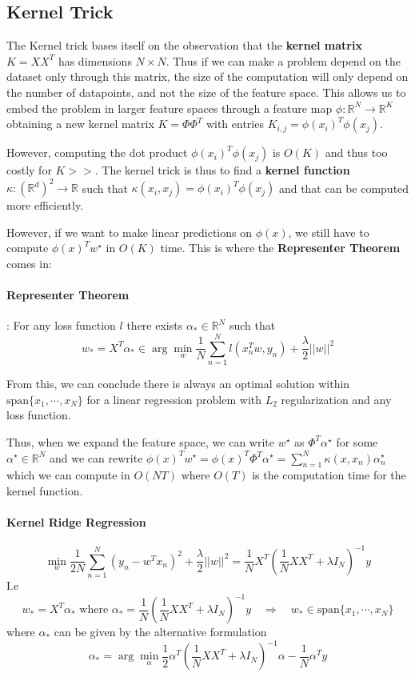 \documentclass{article}
\newcommand{\R}{\mathbb{R}}
\begin{document}
\subsection{Kernel Trick}

The Kernel trick bases itself on the observation that the \textbf{kernel matrix} $K = X X^T$ has dimensions $N \times N$.
Thus if we can make a problem depend on the dataset only through this matrix, the size of the computation will only depend on the number of datapoints, and not the size of the feature space.
This allows us to embed the problem in larger feature spaces through a feature map $\phi : \R^N \to \R^K$ obtaining a new kernel matrix $K = \Phi \Phi^T$ with entries $K_{i,j} = \phi(x_i)^T \phi(x_j)$.

However, computing the dot product $\phi(x_i)^T \phi(x_j)$ is $O(K)$ and thus too costly for $K >>$.
The kernel trick is thus to find a \textbf{kernel function} $\kappa : (\R^d)^2 \to \R$ such that $\kappa(x_i, x_j) = \phi(x_i)^T \phi(x_j)$ and that can be computed more efficiently.

However, if we want to make linear predictions on $\phi(x)$, we still have to compute $\phi(x)^T w^\star$ in $O(K)$ time.
This is where the \textbf{Representer Theorem} comes in:

\paragraph{Representer Theorem}:
For any loss function $l$ there exists $\alpha_* \in \R^N$ such that
$$
w_* = X^T \alpha_* \in \arg \min_w \frac{1}{N} \sum_{n=1}^N l(x_n^T w, y_n) + \frac{\lambda}{2} ||w||^2
$$

From this, we can conclude there is always an optimal solution within $\text{span} \{ x_1, \cdots, x_N \}$ for a linear regression problem with $L_2$ regularization and any loss function.

Thus, when we expand the feature space, we can write $w^\star$ as $\Phi^T \alpha^\star$ for some $\alpha^\star \in \R^N$ and we can rewrite $\phi(x)^T w^\star = \phi(x)^T \Phi^T \alpha^\star = \sum_{n=1}^N \kappa(x, x_n) \alpha^\star_n$ which we can compute in $O(NT)$ where $O(T)$ is the computation time for the kernel function.

\paragraph{Kernel Ridge Regression}

$$
\min_w \frac{1}{2N} \sum_{n=1}^N (y_n - w^T x_n)^2 + \frac{\lambda}{2}||w||^2 = 
\frac{1}{N} X^T \left( \frac{1}{N} X X^T + \lambda I_N \right)^{-1} y
$$
I.e
$$
w_* = X^T \alpha_* \text{ where } \alpha_* = \frac{1}{N} \left( \frac{1}{N} X X^T + \lambda I_N \right)^{-1} y \quad \Rightarrow \quad
w_* \in \text{span}\{x_1, \cdots, x_N\}
$$
where $\alpha_*$ can be given by the alternative formulation
$$
\alpha_* = \arg \min_\alpha \frac{1}{2} \alpha^T \left( \frac{1}{N} XX^T + \lambda I_N \right)^{-1} \alpha - \frac{1}{N} \alpha^T y
$$
\end{document}
